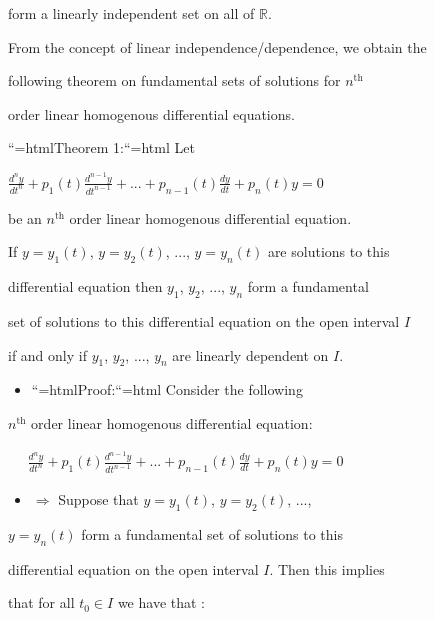 form a linearly independent set on all of $\mathbb{R}$.



From the concept of linear independence/dependence, we obtain the

following theorem on fundamental sets of solutions for $n^{\mathrm{th}}$

order linear homogenous differential equations.







``{=html}Theorem 1:``{=html} Let

$\frac{d^ny}{dt^n} + p_1(t) \frac{d^{n-1}y}{dt^{n-1}} + ... + p_{n-1}(t) \frac{dy}{dt} + p_n(t)y = 0$

be an $n^{\mathrm{th}}$ order linear homogenous differential equation.

If $y = y_1(t)$, $y = y_2(t)$, ..., $y = y_n(t)$ are solutions to this

differential equation then $y_1$, $y_2$, ..., $y_n$ form a fundamental

set of solutions to this differential equation on the open interval $I$

if and only if $y_1$, $y_2$, ..., $y_n$ are linearly dependent on $I$.







\begin{itemize}
    \item ``{=html}Proof:``{=html} Consider the following
\end{itemize}
    $n^{\mathrm{th}}$ order linear homogenous differential equation:



$\begin{aligned} \quad \frac{d^ny}{dt^n} + p_1(t) \frac{d^{n-1}y}{dt^{n-1}} + ... + p_{n-1}(t) \frac{dy}{dt} + p_n(t)y = 0 \end{aligned}$



\begin{itemize}
    \item $\Rightarrow$ Suppose that $y = y_1(t)$, $y = y_2(t)$, ...,
\end{itemize}
    $y = y_n(t)$ form a fundamental set of solutions to this

    differential equation on the open interval $I$. Then this implies

    that for all $t_0 \in I$ we have that :



